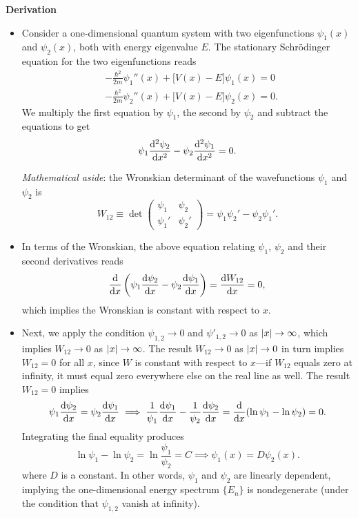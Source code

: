 \documentclass[11pt, a4paper]{article}
\newcommand{\Schro}{Schr\"{o}dinger\xspace}
\newcommand{\p}{\psi}  %
\begin{document}
\vspace{2mm}
\textbf{Derivation}
\begin{itemize}
    \item Consider a one-dimensional quantum system with two eigenfunctions $ \psi_{1}(x) $ and $ \psi_{2}(x) $, both with energy eigenvalue $ E $. The stationary \Schro equation for the two eigenfunctions reads
	\begin{align*}
		& -\frac{\hbar^{2}}{2m}\psi_{1}''(x) + \big[V(x) - E\big]\p_{1}(x) = 0\\
		& -\frac{\hbar^{2}}{2m}\psi_{2}''(x) + \big[V(x) - E\big]\p_{2}(x) = 0.
	\end{align*}
	We multiply the first equation by $ \p_{1} $, the second by $ \p_{2} $ and subtract the equations to get
	\begin{equation*}
		\p_{1}\dv[2]{\p_{2}}{x} - \p_{2}\dv[2]{\p_{1}}{x} = 0.
	\end{equation*}
	
	\textit{Mathematical aside}: the Wronskian determinant of the wavefunctions $ \p_{1} $ and $ \p_{2} $ is
	\begin{equation*}
		W_{12} \equiv \det 
		\begin{pmatrix}
			\p_{1} & \p_{2}\\
			\p_{1}' & \p_{2}'
		\end{pmatrix}
		= \p_{1}\p_{2}' - \p_{2}\p_{1}'.
	\end{equation*}
	
	\item In terms of the Wronskian, the above equation relating $ \p_{1} $, $ \p_{2} $ and their second derivatives reads
	\begin{equation*}
		\dv{x}\left(\p_{1}\dv{\p_{2}}{x} - \p_{2}\dv{\p_{1}}{x}\right) = \dv{W_{12}}{x} = 0,
	\end{equation*}
	which implies the Wronskian is constant with respect to $ x $. 
	
	\item Next, we apply the condition $ \p_{1, 2} \to 0 $ and $ \p'_{1, 2} \to 0 $ as $ \abs{x} \to \infty $, which implies $ W_{12} \to 0 $ as $ \abs{x} \to \infty  $. The result $ W_{12} \to 0 $ as $ \abs{x} \to 0 $ in turn implies $ W_{12} = 0 $ for all $ x $, since $ W $ is constant with respect to $ x $---if $ W_{12} $ equals zero at infinity, it must equal zero everywhere else on the real line as well. The result $ W_{12} = 0 $ implies
	\begin{equation*}
		\p_{1}\dv{\p_{2}}{x} = \p_{2}\dv{\p_{1}}{x} \implies \frac{1}{\p_{1}} \dv{\p_{1}}{x} - \frac{1}{\p_{2}} \dv{\p_{2}}{x} = \dv{x}(\ln \p_{1} - \ln \p_{2}) = 0.
	\end{equation*}
	Integrating the final equality produces
	\begin{equation*}
		\ln \p_{1} - \ln \p_{2} = \ln \frac{\p_{1}}{\p_{2}} = C \implies \p_{1}(x) = D \p_{2}(x).
	\end{equation*}
    where $ D $ is a constant. In other words, $ \p_{1} $ and $ \p_{2} $ are linearly dependent, implying the one-dimensional energy spectrum $ \{E_{n}\} $ is nondegenerate (under the condition that $ \p_{1,2} $ vanish at infinity).
\end{itemize}
\end{document}
